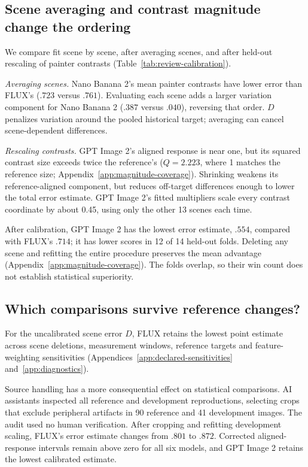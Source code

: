 \subsection{Scene averaging and contrast magnitude change the ordering}
We compare fit scene by scene, after averaging scenes, and after held-out
rescaling of painter contrasts (Table~\ref{tab:review-calibration}).

\emph{Averaging scenes.} Nano Banana 2's mean painter contrasts have lower error than FLUX's
($.723$ versus $.761$). Evaluating each scene adds a larger variation component
for Nano Banana 2 ($.387$ versus $.040$), reversing that order.
$D$ penalizes variation around the pooled historical target; averaging can
cancel scene-dependent differences.



\emph{Rescaling contrasts.} GPT Image 2's aligned response is near one, but its
squared contrast size exceeds twice the reference's ($Q=2.223$, where 1 matches the reference size;
Appendix~\ref{app:magnitude-coverage}).
Shrinking weakens its reference-aligned component, but reduces off-target
differences enough to lower the total error estimate. GPT Image 2's fitted multipliers
scale every contrast coordinate by about 0.45, using only the other 13 scenes each time.

After calibration, GPT Image 2 has the lowest error estimate, $.554$,
compared with FLUX's $.714$; it has lower scores in 12 of 14 held-out folds.
Deleting any scene and refitting the entire procedure preserves the mean
advantage (Appendix~\ref{app:magnitude-coverage}).
The folds overlap, so their win count does not establish statistical superiority.

\subsection{Which comparisons survive reference changes?}\label{sec:source-correction}
For the uncalibrated scene error $D$, FLUX retains the lowest point
estimate across scene deletions, measurement windows, reference targets and
feature-weighting sensitivities (Appendices~\ref{app:declared-sensitivities}
and~\ref{app:diagnostics}).

Source handling has a more consequential effect on statistical comparisons.
AI assistants inspected all reference and development reproductions, selecting
crops that exclude peripheral artifacts in 90 reference and 41 development images.
The audit used no human verification. After cropping and refitting development scaling,
FLUX's error estimate changes from $.801$ to $.872$. Corrected aligned-response
intervals remain above zero for all six models, and GPT Image 2 retains the lowest
calibrated estimate.

